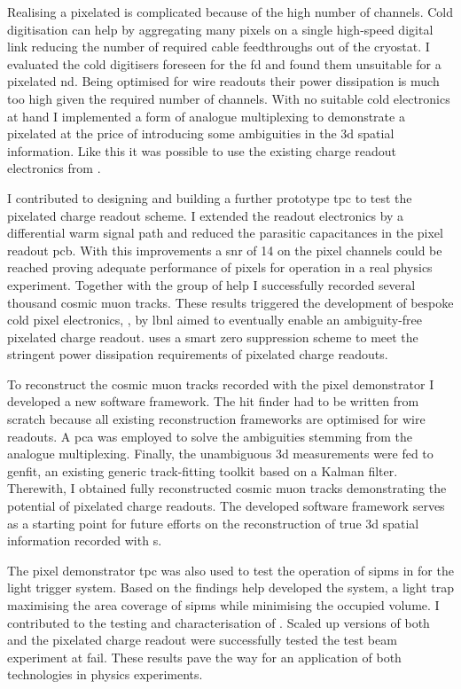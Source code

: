 Realising a pixelated \lartpc{} is complicated because of the high number of channels.
Cold digitisation can help by aggregating many pixels on a single high-speed digital link reducing the number of required cable feedthroughs out of the cryostat.
I evaluated the cold digitisers foreseen for the \dune{} \gls{fd} and found them unsuitable for a pixelated \gls{nd}.
Being optimised for wire readouts their power dissipation is much too high given the required number of channels.
With no suitable cold electronics at hand I implemented a form of analogue multiplexing to demonstrate a pixelated \lartpc{} at the price of introducing some ambiguities in the \gls{3d} spatial information.
Like this it was possible to use the existing charge readout electronics from \AT{}.

I contributed to designing and building a further prototype \gls{tpc} to test the pixelated charge readout scheme.
I extended the \AT{} readout electronics by a differential warm signal path and reduced the parasitic capacitances in the pixel readout \gls{pcb}.
With this improvements a \gls{snr} of \num{14} on the pixel channels could be reached proving adequate performance of pixels for operation in a real physics experiment.
Together with the \lar{} group of \gls{help} I successfully recorded several thousand cosmic muon tracks.
These results triggered the development of bespoke cold pixel electronics, \larpix{}, by \gls{lbnl} aimed to eventually enable an ambiguity-free pixelated \lartpc{} charge readout.
\larpix{} uses a smart zero suppression scheme to meet the stringent power dissipation requirements of pixelated \lartpc{} charge readouts.

To reconstruct the cosmic muon tracks recorded with the pixel demonstrator I developed a new software framework.
The hit finder had to be written from scratch because all existing \lartpc{} reconstruction frameworks are optimised for wire readouts.
A \gls{pca} was employed to solve the ambiguities stemming from the analogue multiplexing.
Finally, the unambiguous \gls{3d} measurements were fed to \gls{genfit}, an existing generic track-fitting toolkit based on a Kalman filter.
Therewith, I obtained fully reconstructed cosmic muon tracks demonstrating the potential of pixelated \lartpc{} charge readouts.
The developed software framework serves as a starting point for future efforts on the reconstruction of true \gls{3d} spatial information recorded with \lartpc{}s.

The pixel demonstrator \gls{tpc} was also used to test the operation of \glspl{sipm} in \lar{} for the light trigger system.
Based on the findings \gls{help} developed the \AL{} system, a light trap maximising the area coverage of \glspl{sipm} while minimising the occupied volume.
I contributed to the testing and characterisation of \AL{}.
Scaled up versions of both \AL{} and the pixelated charge readout were successfully tested the \pixlar{} test beam experiment at \gls{fail}.
These results pave the way for an application of both technologies in physics experiments.

